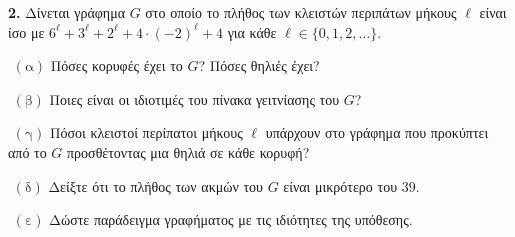 \documentclass[oneside,a4paper]{article}
\begin{document}
\pagebreak

\noindent \textbf{2.} Δίνεται γράφημα $G$ στο οποίο το πλήθος των κλειστών περιπάτων μήκους $\ell$ είναι ίσο με $6^{\ell} + 3^{\ell} + 2^{\ell} + 4\cdot(-2)^{\ell} + 4$ για κάθε ${\ell} \in \{0,1,2,\ldots\}$.

$ $\newline
$(\text{α})$ Πόσες κορυφές έχει το $G$? Πόσες θηλιές έχει?

$ $\newline
$(\text{β})$ Ποιες είναι οι ιδιοτιμές του πίνακα γειτνίασης του $G$?

$ $\newline
$(\text{γ})$ Πόσοι κλειστοί περίπατοι μήκους $\ell$ υπάρχουν στο γράφημα που προκύπτει από το $G$ προσθέτοντας μια θηλιά σε κάθε κορυφή?

$ $\newline
$(\text{δ})$ Δείξτε ότι το πλήθος των ακμών του $G$ είναι μικρότερο του $39$.

$ $\newline
$(\text{ε})$ Δώστε παράδειγμα γραφήματος με τις ιδιότητες της υπόθεσης.
\end{document}
